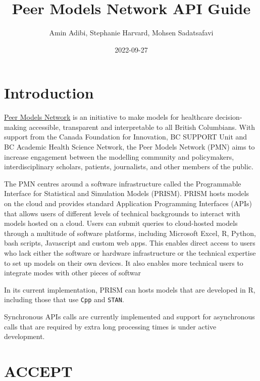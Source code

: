 \documentclass[
]{book}
\title{Peer Models Network API Guide}
\author{Amin Adibi, Stephanie Harvard, Mohsen Sadatsafavi}
\date{2022-09-27}
\begin{document}
\maketitle

{
\setcounter{tocdepth}{1}
\tableofcontents
}
\hypertarget{introduction}{%
\chapter{Introduction}\label{introduction}}

\href{https://www.peermodelsnetwork.com/}{Peer Models Network} is an initiative to make models for healthcare decision-making accessible, transparent and interpretable to all British Columbians. With support from the Canada Foundation for Innovation, BC SUPPORT Unit and BC Academic Health Science Network, the Peer Models Network (PMN) aims to increase engagement between the modelling community and policymakers, interdisciplinary scholars, patients, journalists, and other members of the public.

The PMN centres around a software infrastructure called the Programmable Interface for Statistical and Simulation Models (PRISM). PRISM hosts models on the cloud and provides standard Application Programming Interfaces (APIs) that allows users of different levels of technical backgrounds to interact with models hosted on a cloud. Users can submit queries to cloud-hosted models through a multitude of software platforms, including Microsoft Excel, R, Python, bash scripts, Javascript and custom web apps. This enables direct access to users who lack either the software or hardware infrastructure or the technical expertise to set up models on their own devices. It also enables more technical users to integrate modes with other pieces of softwar

In its current implementation, PRISM can hosts models that are developed in R, including those that use \texttt{Cpp} and \texttt{STAN}.

Synchronous APIs calls are currently implemented and support for asynchronous calls that are required by extra long processing times is under active development.

\hypertarget{accept}{%
\chapter{ACCEPT}\label{accept}}
\end{document}
